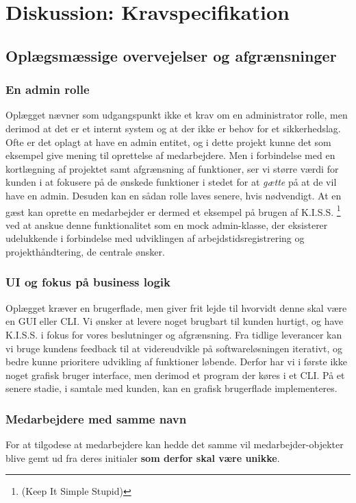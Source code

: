 \section{Diskussion: Kravspecifikation}
\subsection{Oplægsmæssige overvejelser og afgrænsninger}
\subsubsection{En admin rolle}
Oplægget nævner som udgangspunkt ikke et krav om en administrator rolle, men derimod at det er et internt system og at der ikke er behov for et sikkerhedslag. Ofte er det oplagt at have en admin entitet, og i dette projekt kunne det som eksempel give mening til oprettelse af medarbejdere. Men i forbindelse med en kortlægning af projektet samt afgrænsning af funktioner, ser vi større værdi for kunden i at fokusere på de ønskede funktioner i stedet for at \textit{gætte} på at de vil have en admin. Desuden kan en sådan rolle laves senere, hvis nødvendigt. At en gæst kan oprette en medarbejder er dermed et eksempel på brugen af K.I.S.S. \footnote{(Keep It Simple Stupid)} ved at anskue denne funktionalitet som en mock admin-klasse, der eksisterer udelukkende i forbindelse med udviklingen af arbejdstidsregistrering og projekthåndtering, de centrale ønsker.
\subsubsection{UI og fokus på business logik}
Oplægget kræver en brugerflade, men giver frit lejde til hvorvidt denne skal være en GUI eller CLI. Vi ønsker at levere noget brugbart til kunden hurtigt, og have K.I.S.S. i fokus for vores beslutninger og afgrænsning. Fra tidlige leverancer kan vi bruge kundens feedback til at videreudvikle på softwareløsningen iterativt, og bedre kunne prioritere udvikling af funktioner løbende. Derfor har vi i første ikke noget grafisk bruger interface, men derimod et program der køres i et CLI. På et senere stadie, i samtale med kunden, kan en grafisk brugerflade implementeres.
\subsubsection{Medarbejdere med samme navn}
For at tilgodese at medarbejdere kan hedde det samme vil medarbejder-objekter blive gemt ud fra deres initialer \textbf{som derfor skal være unikke}.
